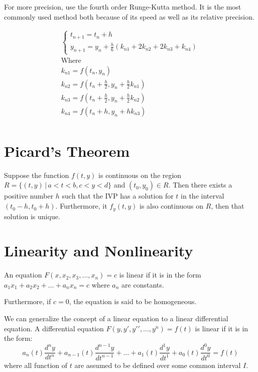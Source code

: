     For more precision, use the fourth order Runge-Kutta method. It is the most commonly used method both because of its speed as well as its relative precision.

    \begin{equation}\label{eq:4ork}
    \begin{aligned}
    \begin{cases}
    t_{n+1} = t_n + h\\
    y_{n+1} = y_n + \frac{h}{6} \left( k_{n1} + 2 k_{n2} + 2 k_{n3} + k_{n4} \right)
    \end{cases}\\
    \text{Where}\\
    k_{n1} = f(t_n, y_n)\\
    k_{n2} = f \left( t_n + \frac{h}{2}, y_n + \frac{h}{2} k_{n1} \right)\\
    k_{n3} = f \left( t_n + \frac{h}{2}, y_n + \frac{h}{2} k_{n2} \right)\\
    k_{n4} = f \left( t_n + h, y_n + h k_{n3} \right)\\
    \end{aligned}
    \end{equation}

\section{Picard's Theorem}\label{sec:picardstheorem}

    \begin{thm}[Picard's]
        Suppose the function $f(t, y)$ is continuous on the region $R=\{ (t,y) \, | \, a < t < b, c < y < d \}$ and $(t_0, y_0) \in R$. Then there exists a positive number $h$ such that the IVP has a solution for $t$ in the interval $(t_0 - h, t_0 + h)$. Furthermore, it $f_y(t,y)$ is also continuous on $R$, then that solution is unique.
    \end{thm}

\section{Linearity and Nonlinearity}
An equation $F(x, x_2, x_3, \dots, x_n) = c$ is linear if it is in the form $a_1x_1 + a_2x_2 + \dots + a_nx_n = c$ where $a_n$ are constants.

Furthermore, if $c=0$, the equation is said to be homogeneous.

We can generalize the concept of a linear equation to a linear differential equation. A differential equation $F(y, y\prime, y\prime\prime, \dots, y^n) = f(t)$ is linear if it is in the form:
\[
a_n(t) \frac{d^ny}{dt^n} + a_{n-1}(t) \frac{d^{n-1}y}{dt^{n-1}} + \dots + a_1(t) \frac{d^1y}{dt^1} + a_0(t) \frac{d^0y}{dt^0} = f(t)
\]
where all function of $t$ are assumed to be defined over some common interval $I$.

